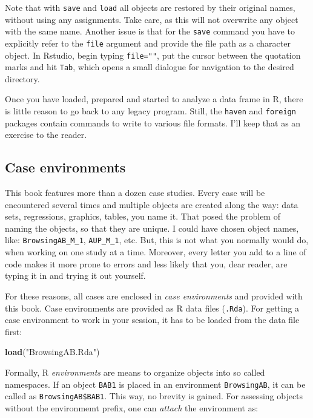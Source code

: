 \documentclass[]{svmono}
\newenvironment{Shaded}{\begin{snugshade}}{\end{snugshade}}
\newcommand{\KeywordTok}[1]{\textcolor[rgb]{0.13,0.29,0.53}{\textbf{#1}}}
\newcommand{\StringTok}[1]{\textcolor[rgb]{0.31,0.60,0.02}{#1}}
\newcommand{\NormalTok}[1]{#1}
\begin{document}
Note that with \texttt{save} and \texttt{load} all objects are restored
by their original names, without using any assignments. Take care, as
this will not overwrite any object with the same name. Another issue is
that for the \texttt{save} command you have to explicitly refer to the
\texttt{file} argument and provide the file path as a character object.
In Rstudio, begin typing \texttt{file=""}, put the cursor between the
quotation marks and hit \texttt{Tab}, which opens a small dialogue for
navigation to the desired directory.

Once you have loaded, prepared and started to analyze a data frame in R,
there is little reason to go back to any legacy program. Still, the
\texttt{haven} and \texttt{foreign} packages contain commands to write
to various file formats. I'll keep that as an exercise to the reader.

\subsection{Case environments}\label{case-environments}

This book features more than a dozen case studies. Every case will be
encountered several times and multiple objects are created along the
way: data sets, regressions, graphics, tables, you name it. That posed
the problem of naming the objects, so that they are unique. I could have
chosen object names, like: \texttt{BrowsingAB\_M\_1},
\texttt{AUP\_M\_1}, etc. But, this is not what you normally would do,
when working on one study at a time. Moreover, every letter you add to a
line of code makes it more prone to errors and less likely that you,
dear reader, are typing it in and trying it out yourself.

For these reasons, all cases are enclosed in \emph{case environments}
and provided with this book. Case environments are provided as R data
files (\texttt{.Rda}). For getting a case environment to work in your
session, it has to be loaded from the data file first:

\begin{Shaded}
\begin{Highlighting}[]
\KeywordTok{load}\NormalTok{(}\StringTok{"BrowsingAB.Rda"}\NormalTok{)}
\end{Highlighting}
\end{Shaded}

Formally, R \emph{environments} are means to organize objects into so
called namespaces. If an object \texttt{BAB1} is placed in an
environment \texttt{BrowsingAB}, it can be called as
\texttt{BrowsingAB\$BAB1}. This way, no brevity is gained. For assessing
objects without the environmemt prefix, one can \emph{attach} the
environment as:
\end{document}

